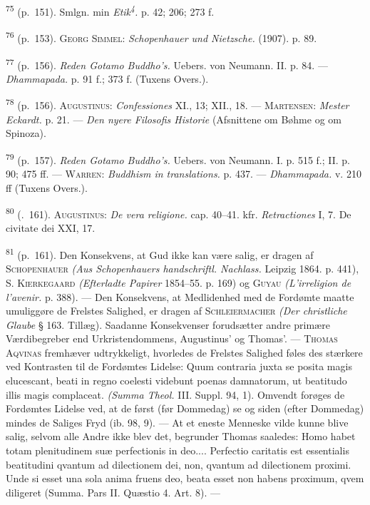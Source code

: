 \documentclass[12pt,a4paper,openany]{book}
\begin{document}
\begin{small}
\textsuperscript{75} (p.~151). Smlgn. min
\textit{Etik\textsuperscript{4}.} p. 42; 206; 273 f.

\textsuperscript{76} (p.~153). \textsc{Georg Simmel}:
\textit{Schopenhauer und Nietzsche.} (1907). p.
89.

\textsuperscript{77} (p.~156). \textit{Reden Gotamo Buddho’s.} Uebers.
von Neumann. II. p. 84. ---
\textit{Dhammapada.} p. 91 f.; 373 f. (Tuxens Overs.).

\textsuperscript{78} (p.~156). \textsc{Augustinus}:
\textit{Confessiones} XI., 13; XII., 18. ---
\textsc{Martensen}: \textit{Mester Eckardt.} p. 21. --- \textit{Den
nyere Filosofis Historie} (Afsnittene om Bøhme og om Spinoza).

\textsuperscript{79} (p.~157). \textit{Reden Gotamo Buddho’s.} Uebers.
von Neumann. I. p. 515 f.; II.
p. 90; 475 ff. --- \textsc{Warren}: \textit{Buddhism in translations.}
p. 437. --- \textit{Dhammapada.} v. 210 ff (Tuxens Overs.).

\textsuperscript{80} (.~161). \textsc{Augustinus}: \textit{De vera
religione.} cap. 40--41. kfr.
\textit{Retractiones} I, 7. De civitate dei XXI, 17.

\textsuperscript{81} (p.~161). Den Konsekvens, at Gud ikke kan være
salig, er dragen af
\textsc{Schopenhauer} \textit{(Aus Schopenhauers
handschriftl. Nachlass.} Leipzig 1864. p. 441), S. \textsc{Kierkegaard}
\textit{(Efterladte Papirer} 1854--55. p. 169) og \textsc{Guyau}
\textit{(L’irreligion de l’avenir.} p. 388). --- Den Konsekvens, at
Medlidenhed med de Fordømte maatte umuliggøre de Frelstes Salighed, er
dragen af \textsc{Schleiermacher} \textit{(Der christliche Glaube} §
163. Tillæg). Saadanne Konsekvenser forudsætter andre primære
Værdibegreber end Urkristendommens, Augustinus’ og Thomas’. ---
\textsc{Thomas Aqvinas} fremhæver udtrykkeligt, hvorledes de Frelstes
Salighed føles des stærkere ved Kontrasten til de Fordømtes Lidelse:
Quum contraria juxta se posita magis elucescant, beati in regno coelesti
videbunt poenas damnatorum, ut beatitudo illis magis complaceat.
\textit{(Summa Theol.} III. Suppl. 94, 1). Omvendt forøges de Fordømtes
Lidelse ved, at de først (før Dommedag) se og siden (efter Dommedag)
mindes de Saliges Fryd (ib. 98, 9). --- At et eneste Menneske vilde
kunne blive salig, selvom alle Andre ikke blev det, begrunder Thomas
saaledes: Homo habet totam plenitudinem suæ perfectionis in deo....
Perfectio caritatis est essentialis beatitudini qvantum ad dilectionem
dei, non, qvantum ad dilectionem proximi. Unde si esset una sola anima
fruens deo, beata esset non habens proximum, qvem diligeret (Summa. Pars
II. Quæstio 4. Art. 8). ---


\end{small}
\end{document}
